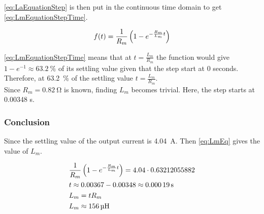 \autoref{eq:LaEquationStep} is then put in the continuous time domain to get \autoref{eq:LmEquationStepTime}.

\begin{equation}
f(t)= \frac{1}{R_m} \left(1-e^{-\frac{R_m}{L_m} t}\right) \addunit{1}
\label{eq:LmEquationStepTime}
\end{equation}

\autoref{eq:LmEquationStepTime} means that at $t=\frac{L_m}{R_m}$ the function would give $1-e^{-1} \approx \SI{63.2}{\percent}$ of its settling value given that the step start at 0 seconds. Therefore, at \SI{63.2}{\percent} of the settling value $t=\frac{L_m}{R_m}$. \\
Since $R_m=\SI{0.82}{\ohm}$ is known, finding $L_m$ becomes trivial. Here, the step starts at 0.00348 s.

\subsubsection*{Conclusion}

Since the settling value of the output current is \SI{4.04}{\ampere}. Then \autoref{eq:LmEq} gives the value of $L_m$.

\begin{subequations} \label{eq:LmEq}
	\begin{flalign}
		&\frac{1}{R_m} \left(1-e^{-\frac{R_m}{L_m} t}\right) = 4.04 \cdot 0.63212055882 \addunit{\second} \\
		&t \approx 0.00367 - 0.00348 \approx \SI{0.00019}{\second} \\
		&L_m=tR_m \\
		&L_m \approx \SI{156}{\micro\henry}
	\end{flalign}
\end{subequations}
